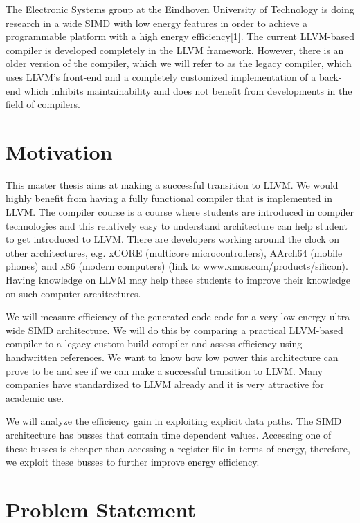 The Electronic Systems group at the Eindhoven University of Technology is doing research in a wide SIMD with low energy features in order to achieve a programmable platform with a high energy efficiency[1]. The current LLVM-based compiler is developed completely in the LLVM framework. However, there is an older version of the compiler, which we will refer to as the legacy compiler, which uses LLVM's front-end and a completely customized implementation of a back-end which inhibits maintainability and does not benefit from developments in the field of compilers.

\newpage \section{Motivation}
This master thesis aims at making a successful transition to LLVM. We would highly benefit from having a fully functional compiler that is implemented in LLVM. The compiler course is a course where students are introduced in compiler technologies and this relatively easy to understand architecture can help student to get introduced to LLVM. There are developers working around the clock on other architectures, e.g. xCORE (multicore microcontrollers), AArch64 (mobile phones) and x86 (modern computers) (link to www.xmos.com/products/silicon). Having knowledge on LLVM may help these students to improve their knowledge on such computer architectures.  

We will measure efficiency of the generated code code for a very low energy ultra wide SIMD architecture. We will do this by comparing a practical LLVM-based compiler to a legacy custom build compiler and assess efficiency using handwritten references. We want to know how low power this architecture can prove to be and see if we can make a successful transition to LLVM. Many companies have standardized to LLVM already and it is very attractive for academic use. %

We will analyze the efficiency gain in exploiting explicit data paths. The SIMD architecture has busses that contain time dependent values. Accessing one of these busses is cheaper than accessing a register file in terms of energy, therefore, we exploit these busses to further improve energy efficiency.    


\section{Problem Statement}


